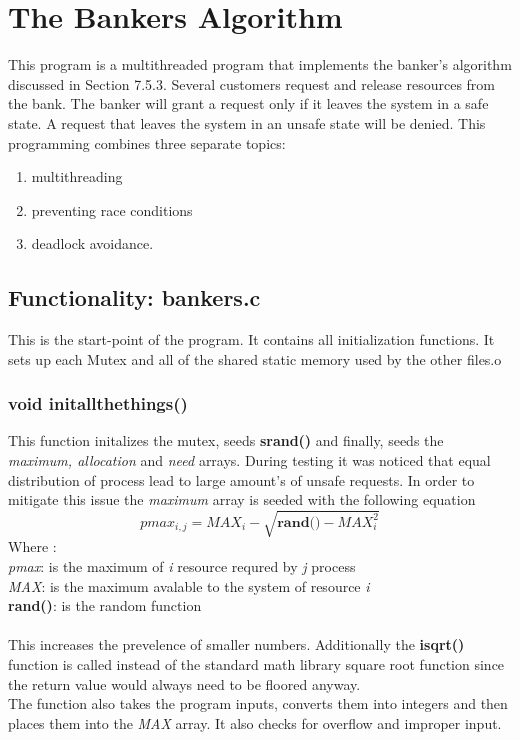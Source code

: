 \documentclass[11pt]{article}
\begin{document}
\section{The Bankers Algorithm}
This program is a multithreaded program that implements the banker’s algorithm discussed in Section 7.5.3.  Several customers request and release resources from the bank.  The banker will grant a request only if it leaves the system in a safe state.  A request that leaves the system in an unsafe state will be denied.  This programming combines three separate topics: 
\begin{enumerate}
\item multithreading
\item preventing race conditions
\item deadlock avoidance. 
\end{enumerate}


\subsection{Functionality: bankers.c}
This is the start-point of the program. It contains all initialization functions. It sets up each Mutex and all of the shared static memory used by the other files.o

\subsubsection{ void init\textunderscore all\textunderscore the\textunderscore things() } 
This function initalizes the mutex, seeds \textbf{srand()} and finally, seeds the \textit{maximum, allocation} and \textit{need} arrays. During testing it was noticed that equal distribution of process lead to large amount's of unsafe requests. In order to mitigate this issue the \textit{maximum} array is seeded with the following equation
$$pmax_{i,j} = MAX_i - \sqrt{ \textbf{rand()} - MAX_i^2} $$
Where : \\
\textit{pmax}: is the maximum of \textit{i} resource requred by \textit{j} process\\
\textit{MAX}: is the maximum avalable to the system of resource \textit{i}\\
\textbf{rand()}: is the random function
\\
\\
This increases the prevelence of smaller numbers. Additionally the \textbf{isqrt()} function is called instead of the standard math library square root function since the return value would always need to be floored anyway.
\\
The function also takes the program inputs, converts them into integers and then places them into the \textit{MAX} array. It also checks for overflow and improper input.
\end{document}
